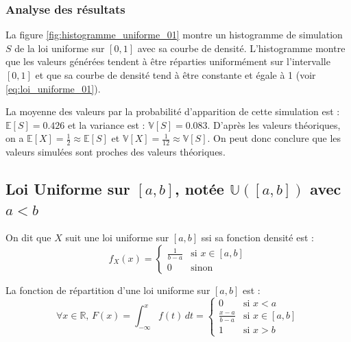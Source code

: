     \subsubsection{Analyse des résultats}
        La figure \ref{fig:histogramme_uniforme_01} montre un histogramme de simulation $S$ de la loi uniforme sur $[0,1]$ avec sa courbe de densité. 
        L'histogramme montre que les valeurs générées tendent à être réparties uniformément sur l'intervalle $[0,1]$ et que sa courbe de densité tend à être constante et égale à 1 (voir \ref{eq:loi_uniforme_01}).

        La moyenne des valeurs par la probabilité d'apparition de cette simulation est : $\mathbb{E}[S] = 0.426$ et la variance est : $\mathbb{V}[S] = 0.083$. D'après les valeurs théoriques, on a $\mathbb{E}[X] = \frac{1}{2} \approx \mathbb{E}[S]$ et $\mathbb{V}[X] = \frac{1}{12} \approx \mathbb{V}[S]$. On peut donc conclure que les valeurs simulées sont proches des valeurs théoriques.

    \subsection{Loi Uniforme sur $[a,b]$, notée $\mathbb{U}([a,b])$ avec $a < b$}

        On dit que $X$ suit une loi uniforme sur $[a,b]$ ssi sa fonction densité est : 
        \begin{equation}
            f_X(x) = \left\{
                \begin{array}{ll}
                    \frac{1}{b-a} & \text{si } x \in [a,b] \\
                    0 & \text{sinon}
                \end{array}
            \right.
        \label{eq:loi_uniforme_ab}
        \end{equation}

        La fonction de répartition d’une loi uniforme sur $[a,b]$ est :
        \begin{equation}
            \forall x\in\mathbb R,\, F(x)=\int_{-\infty}^x f(t)\,dt = \left\{
                \begin{array}{ll}
                    0 & \text{si } x < a \\
                    \frac{x-a}{b-a} & \text{si } x \in [a,b] \\
                    1 & \text{si } x > b
                \end{array}
            \right.
        \end{equation}

